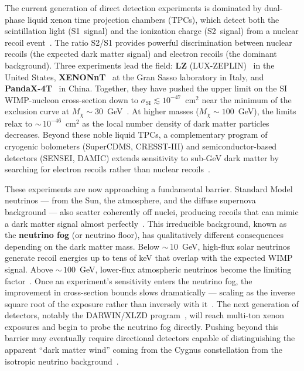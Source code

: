 The current generation of direct detection experiments is dominated by dual-phase liquid xenon time projection chambers (TPCs), which detect both the scintillation light (S1~signal) and the ionization charge (S2~signal) from a nuclear recoil event~\cite{Cirelli:2024ssz}.
The ratio S2/S1 provides powerful discrimination between nuclear recoils (the expected dark matter signal) and electron recoils (the dominant background).
Three experiments lead the field: \textbf{LZ} (LUX-ZEPLIN)~\cite{LZ:2022lsv} in the United States, \textbf{XENONnT}~\cite{XENON:2023cxc} at the Gran Sasso laboratory in Italy, and \textbf{PandaX-4T}~\cite{PandaX-4T:2021bab} in China.
Together, they have pushed the upper limit on the SI WIMP-nucleon cross-section down to $\sigma_\text{SI} \lesssim 10^{-47}$~cm$^2$ near the minimum of the exclusion curve at $M_\chi \sim 30$~GeV~\cite{LZ:2022lsv,XENON:2023cxc,PandaX-4T:2021bab,Cirelli:2024ssz}.
At higher masses ($M_\chi \sim 100$~GeV), the limits relax to ${\sim}\,10^{-46}$~cm$^2$ as the local number density of dark matter particles decreases.
Beyond these noble liquid TPCs, a complementary program of cryogenic bolometers (SuperCDMS, CRESST-III) and semiconductor-based detectors (SENSEI, DAMIC) extends sensitivity to sub-GeV dark matter by searching for electron recoils rather than nuclear recoils~\cite{Cirelli:2024ssz}.

These experiments are now approaching a fundamental barrier.
Standard Model neutrinos --- from the Sun, the atmosphere, and the diffuse supernova background --- also scatter coherently off nuclei, producing recoils that can mimic a dark matter signal almost perfectly~\cite{Cirelli:2024ssz}.
This irreducible background, known as the \textbf{neutrino fog} (or neutrino floor), has qualitatively different consequences depending on the dark matter mass.
Below ${\sim}\,10$~GeV, high-flux solar neutrinos generate recoil energies up to tens of keV that overlap with the expected WIMP signal.
Above ${\sim}\,100$~GeV, lower-flux atmospheric neutrinos become the limiting factor~\cite{Cirelli:2024ssz}.
Once an experiment's sensitivity enters the neutrino fog, the improvement in cross-section bounds slows dramatically --- scaling as the inverse square root of the exposure rather than inversely with it~\cite{OHare:2021utq}.
The next generation of detectors, notably the DARWIN/XLZD program~\cite{DARWIN:2016hyl}, will reach multi-ton xenon exposures and begin to probe the neutrino fog directly.
Pushing beyond this barrier may eventually require directional detectors capable of distinguishing the apparent ``dark matter wind'' coming from the Cygnus constellation from the isotropic neutrino background~\cite{Cirelli:2024ssz}.


